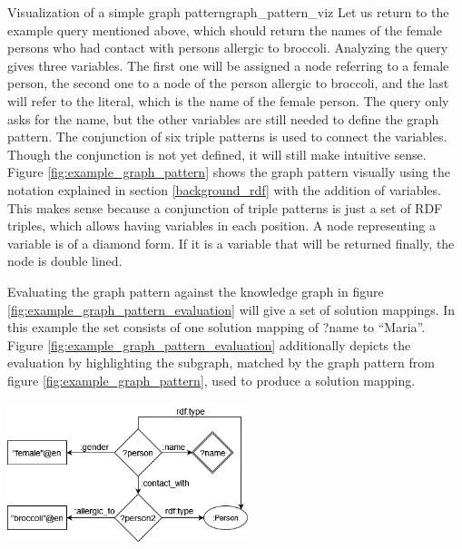\begin{Bsp}{Visualization of a simple graph pattern}{graph_pattern_viz}
Let us return to the example query mentioned above, which should return the names of the female persons who had contact with persons allergic to broccoli. Analyzing the query gives three variables. The first one will be assigned a node referring to a female person, the second one to a node of the person allergic to broccoli, and the last will refer to the literal, which is the name of the female person. The query only asks for the name, but the other variables are still needed to define the graph pattern. 
The conjunction of six triple patterns is used to connect the variables. Though the conjunction is not yet defined, it will still make intuitive sense.
Figure \ref{fig:example_graph_pattern} shows the graph pattern visually using the notation explained in section \ref{background_rdf} with the addition of variables. This makes sense because a conjunction of triple patterns is just a set of RDF triples, which allows having variables in each position. A node representing a variable is of a diamond form. If it is a variable that will be returned finally, the node is double lined. 

Evaluating the graph pattern against the knowledge graph in figure \ref{fig:example_graph_pattern_evaluation} will give a set of solution mappings. In this example the set consists of one solution mapping of ?name to ``Maria''. Figure \ref{fig:example_graph_pattern_evaluation} additionally depicts the evaluation by highlighting the subgraph, matched by the graph pattern from figure \ref{fig:example_graph_pattern}, used to produce a solution mapping. 
\captionsetup{type=htypei}
    \begin{minipage}[t]{\linewidth}
            \centering
            \vspace{1ex}
            \includegraphics[width=7cm]{images/sparql/graph_pattern_viz.png}
            \label{fig:example_graph_pattern}
            \vspace{1ex}
        \end{minipage}
 

\end{Bsp}
